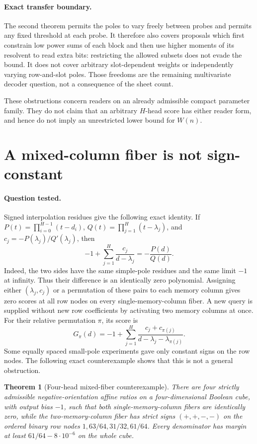 \documentclass[11pt]{article}
\newtheorem{theorem}{Theorem}
\begin{document}
\paragraph{Exact transfer boundary.}
The second theorem permits the poles to vary freely between probes
and permits any fixed threshold at each probe. It therefore also
covers proposals which first constrain low power sums of each block
and then use higher moments of its resolvent to read extra bits:
restricting the allowed subsets does not evade the bound. It does
not cover arbitrary slot-dependent weights or independently varying
row-and-slot poles. Those freedoms are the remaining multivariate
decoder question, not a consequence of the sheet count.

These obstructions concern readers on an already admissible compact
parameter family. They do not claim that an arbitrary $H$-head score
has either reader form, and hence do not imply an unrestricted lower
bound for $W(n)$.

\section{A mixed-column fiber is not sign-constant}

\paragraph{Question tested.}
Signed interpolation residues give the following exact identity. If
$P(t)=\prod_{i=0}^{H-1}(t-d_i)$, $Q(t)=\prod_{j=1}^H(t-\lambda_j)$,
and $c_j=-P(\lambda_j)/Q'(\lambda_j)$, then
\[
 -1+\sum_{j=1}^H\frac{c_j}{d-\lambda_j}
       =-\frac{P(d)}{Q(d)}.
\]
Indeed, the two sides have the same simple-pole residues and the same
limit $-1$ at infinity. Thus their difference is an identically zero
polynomial. Assigning either $(\lambda_j,c_j)$ or a permutation of
these pairs to each memory column gives zero scores at all row nodes
on every single-memory-column fiber. A new query is supplied without
new row coefficients by activating two memory columns at once.
For their relative permutation $\pi$, its score is
\[
 G_\pi(d)=-1+\sum_{j=1}^H
       \frac{c_j+c_{\pi(j)}}{d-\lambda_j-\lambda_{\pi(j)}}.
\]
Some equally spaced small-pole experiments gave only constant signs
on the row nodes. The following exact counterexample shows that this
is not a general obstruction.

\begin{theorem}[Four-head mixed-fiber counterexample]
There are four strictly admissible negative-orientation affine ratios
on a four-dimensional Boolean cube, with output bias $-1$, such that
both single-memory-column fibers are identically zero, while the
two-memory-column fiber has strict signs $(+,+,-,-)$ on the ordered
binary row nodes $1,63/64,31/32,61/64$. Every denominator has margin
at least $61/64-8\cdot10^{-6}$ on the whole cube.
\end{theorem}
\end{document}
